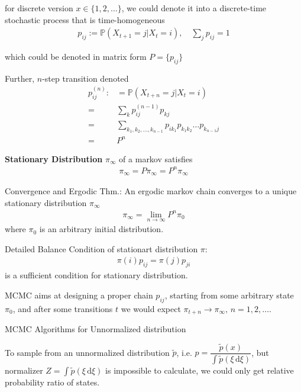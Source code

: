     for discrete version $ x\in\{1,2,\ldots\} $, we could denote it into a discrete-time stochastic process that is time-homogeneous
    \begin{align}
        p_{ij}:= \mathbb{P}\left( X_{t+1}=j|X_{t}=i \right)  ,\quad \sum_{j}p_{ij}=1
    \end{align}

    which could be denoted in matrix form $ P=\{p_{ij}\} $
    
    Further, $ n $-step transition denoted
    \begin{align}
        p^{(n)}_{ij}:&=\mathbb{P}\left( X_{t+n}=j|X_t=i \right) \\
        =&\sum_{k}p^{(n-1)}_{ij}p_{kj}\\
        =&\sum_{k_1,k_2,\ldots ,k_{n-1}}p_{ik_1}p_{k_1k_2}\ldots p_{k_{n-1}j}\\
        =&P^n
    \end{align}

    \textbf{Stationary Distribution} $ \pi_\infty $ of a markov satisfies
    \begin{align}
         \pi_\infty=P\pi_\infty=P^n\pi_{\infty}
    \end{align}
    
    Convergence and Ergodic Thm.: An ergodic markov chain converges to a unique stationary distribution $ \pi_\infty $
    \begin{align}
        \pi_{\infty}=\lim_{n\to\infty}P^n\pi_0 
    \end{align}
    where $ \pi_0 $ is an arbitrary initial distribution.
    
    Detailed Balance Condition of stationart distribution $ \pi $:
    \begin{align}
        \pi(i)p_{ij}=\pi(j)p_{ji} 
    \end{align}
    is a sufficient condition for stationary distribution.
    
    MCMC aims at designing a proper chain $ p_{ij} $, starting from some arbitrary state $ \pi_0 $, and after some transitions $ t $ we would expect $ \pi_{t+n}\to \pi_\infty,\,n=1,2,\ldots  $.
    

    
\begin{point}
    MCMC Algorithms for Unnormalized distribution
\end{point}

    To sample from an unnormalized distribution $ \tilde{p} $, i.e. $ p=\dfrac{\tilde{p}(x)}{\int \tilde{p}(\xi \,\mathrm{d}\xi)} $, but normalizer $ Z=\int \tilde{p}(\xi \,\mathrm{d}\xi) $ is impossible to calculate, we could only get relative probability ratio of states.



